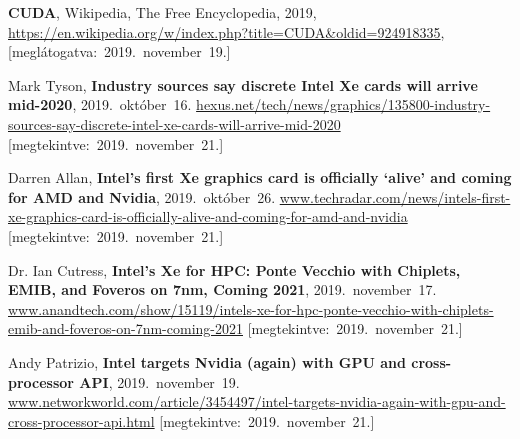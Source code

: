 \begin{thebibliography}{9}
	\textbf{CUDA},
	{Wikipedia}{,} The Free Encyclopedia,
	2019,
	{\footnotesize\url{https://en.wikipedia.org/w/index.php?title=CUDA&oldid=924918335}},
	\mbox{[meglátogatva:~2019.~november~19.]}

	Mark Tyson,
	\textbf{Industry sources say discrete Intel Xe cards will arrive mid-2020},
	2019.~október~16.
	{\footnotesize\url{hexus.net/tech/news/graphics/135800-industry-sources-say-discrete-intel-xe-cards-will-arrive-mid-2020}}
	[megtekintve:~2019.~november~21.]

	Darren Allan,
	\textbf{Intel’s first Xe graphics card is officially ‘alive’ and coming for AMD and Nvidia},
	2019.~október~26.
	{\footnotesize\url{www.techradar.com/news/intels-first-xe-graphics-card-is-officially-alive-and-coming-for-amd-and-nvidia}}
	[megtekintve:~2019.~november~21.]

	Dr. Ian Cutress,
	\textbf{Intel’s Xe for HPC: Ponte Vecchio with Chiplets, EMIB, and Foveros on 7nm, Coming 2021},
	2019.~november~17.
	{\footnotesize\url{www.anandtech.com/show/15119/intels-xe-for-hpc-ponte-vecchio-with-chiplets-emib-and-foveros-on-7nm-coming-2021}}
	[megtekintve:~2019.~november~21.]

	Andy Patrizio,
	\textbf{Intel targets Nvidia (again) with GPU and cross-processor API},
	2019.~november~19.
	{\footnotesize\url{www.networkworld.com/article/3454497/intel-targets-nvidia-again-with-gpu-and-cross-processor-api.html}}
	[megtekintve:~2019.~november~21.]

\end{thebibliography}